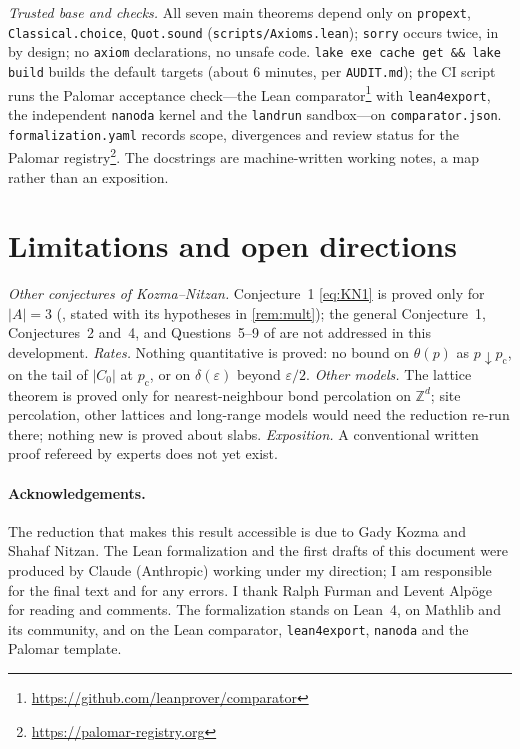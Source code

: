 \documentclass[11pt]{article}
\theoremstyle{definition}
\theoremstyle{remark}
\newcommand{\Zd}{\mathbb{Z}^d}
\newcommand{\pc}{p_{\mathrm c}}
\begin{document}
 \emph{Trusted base and checks.}  All seven main theorems depend only on \texttt{propext}, \texttt{Classical.choice}, \texttt{Quot.sound}
(\texttt{scripts/Axioms.lean}); \texttt{sorry} occurs twice, in  by design; no \texttt{axiom} declarations, no unsafe code.  \texttt{lake exe cache get \&\& lake build} builds the default targets (about 6 minutes, per \texttt{AUDIT.md}); the CI script
runs the Palomar acceptance check---the Lean comparator\footnote{\url{https://github.com/leanprover/comparator}} with \texttt{lean4export}, the
independent \texttt{nanoda} kernel and the \texttt{landrun} sandbox---on \texttt{comparator.json}.  \texttt{formalization.yaml} records scope,
divergences and review status for the Palomar registry\footnote{\url{https://palomar-registry.org}}.  The docstrings are machine-written working notes, a map rather than an exposition.

\section{Limitations and open directions}\label{s:limits}
\emph{Other conjectures of Kozma--Nitzan.}  Conjecture~1 \eqref{eq:KN1} is proved only for $|A|=3$ (, stated
with its hypotheses in \cref{rem:mult}); the general Conjecture~1, Conjectures~2 and~4, and Questions~5--9 of \citep[\S5]{KozmaNitzan2024} are
not addressed in this development.  \emph{Rates.}  Nothing quantitative is proved: no bound on $\theta(p)$ as $p\downarrow\pc$, on
the tail of $|C_0|$ at $\pc$, or on $\delta(\varepsilon)$ beyond $\varepsilon/2$.  \emph{Other models.}  The lattice theorem is proved only for
nearest-neighbour bond percolation on $\Zd$; site percolation, other lattices and long-range models would need the reduction re-run there;
nothing new is proved about slabs.  \emph{Exposition.}  A conventional written proof refereed by experts does not yet exist.

\paragraph{Acknowledgements.}
 The reduction that makes this result accessible is due to Gady Kozma and Shahaf Nitzan.  The Lean formalization and the first drafts of
this document were produced by Claude (Anthropic) working under my direction; I am responsible for the final text and for any errors.
I thank Ralph Furman and Levent Alp\"oge for reading and comments.  The formalization stands on Lean~4, on Mathlib and its community, and
on the Lean comparator, \texttt{lean4export}, \texttt{nanoda} and the Palomar template.


\setlength{\bibsep}{0pt plus 0.3pt}
{\footnotesize}
\end{document}
